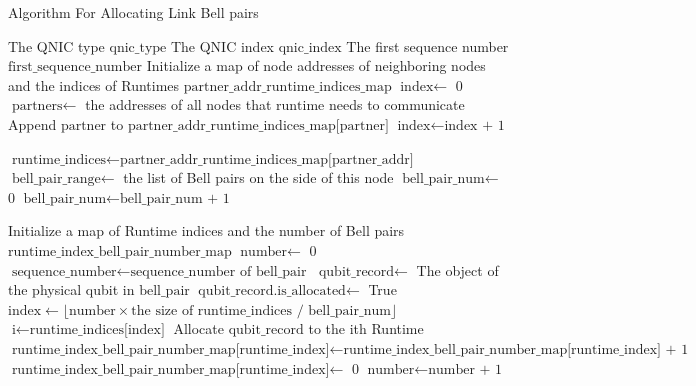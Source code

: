 \begin{algorithm}[H]  
  \begin{minipage}{0.8\linewidth}
  \caption{Algorithm For Allocating Link Bell pairs}                 
  \begin{algorithmic}[1]
    \Require The QNIC type $\text{qnic\_type}$
    \Require The QNIC index $\text{qnic\_index}$
    \Require The first sequence number $\text{first\_sequence\_number}$
    \State Initialize a map of node addresses of neighboring nodes and the indices of Runtimes $\text{partner\_addr\_runtime\_indices\_map}$
    \State $\text{index} \gets$ 0
      \State $\text{partners} \gets$ the addresses of all nodes that $\text{runtime}$ needs to communicate
        \State Append $\text{partner}$ to $\text{partner\_addr\_runtime\_indices\_map[partner]}$
      \EndFor
      \State $\text{index} \gets \text{index + 1}$
    \EndFor

      \State $\text{runtime\_indices} \gets \text{partner\_addr\_runtime\_indices\_map[partner\_addr]}$
      \State $\text{bell\_pair\_range} \gets$ the list of Bell pairs on the side of this node
      \State $\text{bell\_pair\_num} \gets$ 0
        \State $\text{bell\_pair\_num} \gets \text{bell\_pair\_num + 1}$
      \EndFor

      \State  Initialize a map of Runtime indices and the number of Bell pairs $\text{runtime\_index\_bell\_pair\_number\_map}$
      \State $\text{number} \gets$ 0
        \State $\text{sequence\_number} \gets \text{sequence\_number of bell\_pair}$
          \State $\text{qubit\_record} \gets$ The object of the physical qubit in $\text{bell\_pair}$
            \State $\text{qubit\_record.is\_allocated} \gets$ True
            \State $\text{index} \gets \lfloor \text{number} \times \text{the size of runtime\_indices / bell\_pair\_num} \rfloor$
            \State $\text{i} \gets \text{runtime\_indices[index]}$
            \State Allocate $\text{qubit\_record}$ to the ith Runtime
              \State $\text{runtime\_index\_bell\_pair\_number\_map[runtime\_index]} \gets \text{runtime\_index\_bell\_pair\_number\_map[runtime\_index] + 1}$
            \Else
              \State $\text{runtime\_index\_bell\_pair\_number\_map[runtime\_index]} \gets$ 0
            \EndIf
          \EndIf
        \EndIf
        \State $\text{number} \gets \text{number + 1}$
      \EndFor
    \EndFor
  \end{algorithmic}
\end{minipage}
\end{algorithm}

